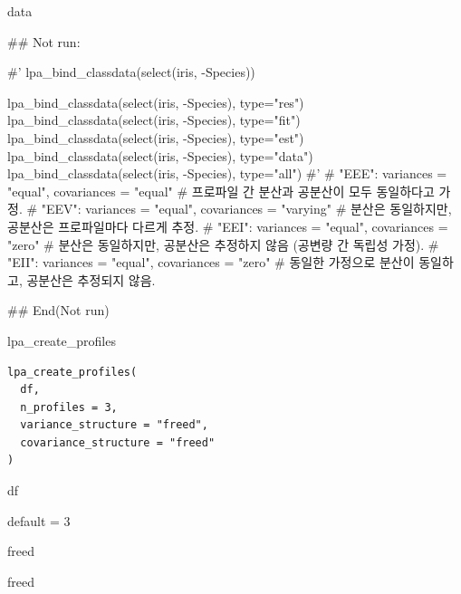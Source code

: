 \documentclass[a4paper]{book}
\begin{document}
%
\begin{Value}
data
\end{Value}
%
\begin{Examples}
\begin{ExampleCode}

## Not run: 

#'
lpa_bind_classdata(select(iris, -Species))

lpa_bind_classdata(select(iris, -Species), type="res")
lpa_bind_classdata(select(iris, -Species), type="fit")
lpa_bind_classdata(select(iris, -Species), type="est")
lpa_bind_classdata(select(iris, -Species), type="data")%
lpa_bind_classdata(select(iris, -Species), type="all")
#'
# "EEE": variances = "equal", covariances = "equal"
# 프로파일 간 분산과 공분산이 모두 동일하다고 가정.
# "EEV": variances = "equal", covariances = "varying"
# 분산은 동일하지만, 공분산은 프로파일마다 다르게 추정.
# "EEI": variances = "equal", covariances = "zero"
# 분산은 동일하지만, 공분산은 추정하지 않음 (공변량 간 독립성 가정).
# "EII": variances = "equal", covariances = "zero"
# 동일한 가정으로 분산이 동일하고, 공분산은 추정되지 않음.

## End(Not run)



\end{ExampleCode}
\end{Examples}
%
\begin{Description}
lpa\_create\_profiles
\end{Description}
%
\begin{Usage}
\begin{verbatim}
lpa_create_profiles(
  df,
  n_profiles = 3,
  variance_structure = "freed",
  covariance_structure = "freed"
)
\end{verbatim}
\end{Usage}
%
\begin{Arguments}
\begin{ldescription}
\item[\code{df}] df

\item[\code{n\_profiles}] default = 3

\item[\code{variance\_structure}] freed

\item[\code{covariance\_structure}] freed
\end{ldescription}
\end{Arguments}
\end{document}
